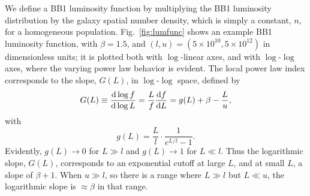 We define a BB1 luminosity function by multiplying the BB1 luminosity distribution by the galaxy spatial number density, which is simply a constant, $n$, for a homogeneous population.
Fig.~\ref{fig:lumfunc} shows an example BB1 luminosity function, with $\beta = 1.5$, and $(l,u) = (5\times 10^{10}, 5\times 10^{12})$ in dimensionless units; it is plotted both with $\log$-linear axes, and with $\log$-$\log$ axes, where the varying power law behavior is evident.
The local power law index corresponds to the slope, $G(L)$, in $\log$-$\log$ space, defined by
\begin{equation}
	G(L) \equiv \frac{\textrm{d}\log{f}}{\textrm{d}\log{L}} = \frac{L}{f} \frac{\textrm{d} f}{\textrm{d} L} = g(L) + \beta - \frac{L}{u},
\end{equation}
with
\begin{equation}
	g(L) = \frac{L}{l}\cdot\frac{1}{e^{L/l} - 1}.
\end{equation}
Evidently, $g(L) \rightarrow 0$ for $L \gg l$ and $g(L) \rightarrow 1$ for $L \ll l$.
Thus the logarithmic slope, $G(L)$, corresponds to an exponential cutoff at large $L$, and at small $L$, a slope of $\beta + 1$.
When $u\gg l$, so there is a range where $L\gg l$ but $L\ll u$, the logarithmic slope is $\approx \beta$ in that range.

